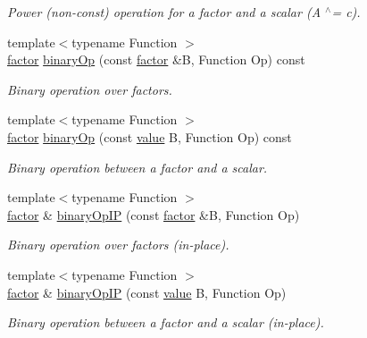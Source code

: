 \begin{DoxyCompactItemize}
\begin{DoxyCompactList}\small\item\em Power (non-\/const) operation for a factor and a scalar (A $^\wedge$= c). \end{DoxyCompactList}\item 
{\footnotesize template$<$typename Function $>$ }\\\hyperlink{classmerlin_1_1factor}{factor} \hyperlink{classmerlin_1_1factor_a563d7aa46cad4410f5aed58c5bb88059}{binary\+Op} (const \hyperlink{classmerlin_1_1factor}{factor} \&B, Function Op) const 
\begin{DoxyCompactList}\small\item\em Binary operation over factors. \end{DoxyCompactList}\item 
{\footnotesize template$<$typename Function $>$ }\\\hyperlink{classmerlin_1_1factor}{factor} \hyperlink{classmerlin_1_1factor_a17e9043b5448fe202165731def4c02d2}{binary\+Op} (const \hyperlink{classmerlin_1_1factor_a1b14d19e509403448fbef26b003c9281}{value} B, Function Op) const 
\begin{DoxyCompactList}\small\item\em Binary operation between a factor and a scalar. \end{DoxyCompactList}\item 
{\footnotesize template$<$typename Function $>$ }\\\hyperlink{classmerlin_1_1factor}{factor} \& \hyperlink{classmerlin_1_1factor_a6c7713d1ba56aab3a262a78253b7e0c1}{binary\+Op\+I\+P} (const \hyperlink{classmerlin_1_1factor}{factor} \&B, Function Op)
\begin{DoxyCompactList}\small\item\em Binary operation over factors (in-\/place). \end{DoxyCompactList}\item 
{\footnotesize template$<$typename Function $>$ }\\\hyperlink{classmerlin_1_1factor}{factor} \& \hyperlink{classmerlin_1_1factor_abde03139bbbfeeee2bb3456208243fa5}{binary\+Op\+I\+P} (const \hyperlink{classmerlin_1_1factor_a1b14d19e509403448fbef26b003c9281}{value} B, Function Op)
\begin{DoxyCompactList}\small\item\em Binary operation between a factor and a scalar (in-\/place). \end{DoxyCompactList}\item 

\end{DoxyCompactItemize}
